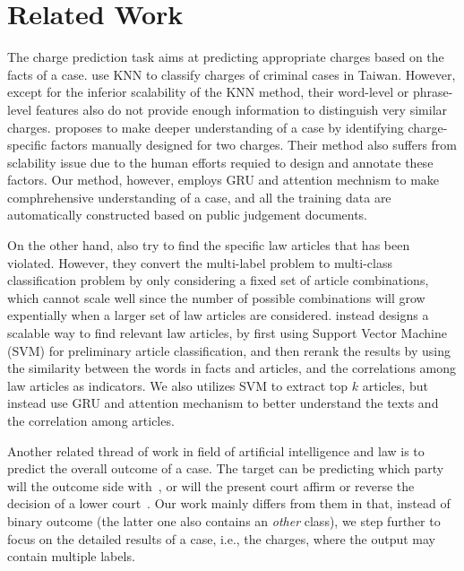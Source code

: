 \section{Related Work}
\label{sec_related_work}
The charge prediction task aims at predicting appropriate charges based on the facts of a case.
\cite{LIU2004case,liu2006exploring} use KNN to classify charges of criminal cases in Taiwan. However, except for the inferior scalability of the KNN method, their word-level or phrase-level features also do not provide enough information to distinguish very similar charges. 
\cite{lin2012exploiting} proposes to make deeper understanding of a case by identifying charge-specific factors manually designed for two charges. Their method also suffers from sclability issue due to the human efforts requied to design and annotate these  factors. Our method, however, employs GRU and attention mechnism to make comphrehensive understanding of a case, and all the training data are automatically constructed based on public judgement documents. 

On the other hand,
\cite{liu2005classifying,liu2006exploring} also try to find the specific law articles that has been violated. However, they convert the multi-label problem to multi-class classification problem by only considering a fixed set of article combinations, which cannot scale well since the number of possible combinations will grow expentially when a larger set of law articles are considered.
\cite{liu2015predicting} instead designs a scalable way to find relevant law articles, 
by first using Support Vector Machine (SVM) for preliminary article classification, and then 
rerank the results by using the similarity between the words in facts and articles, and the correlations among law articles as indicators.
We also utilizes SVM to extract top $k$ articles, but instead use GRU and attention mechanism to better understand the texts and the correlation among articles.

Another related thread of work in field of artificial intelligence and law is to predict the overall outcome of a case. The target can be predicting which party will the outcome side with~\cite{aletras2016predicting}, or will the present court affirm or reverse the decision of a lower court~\cite{katz2016general}. Our work mainly differs from them in that, instead of binary outcome (the latter one also contains an \emph{other} class), we step further to focus on the detailed results of a case, i.e., the charges, where the output may contain multiple labels. 

